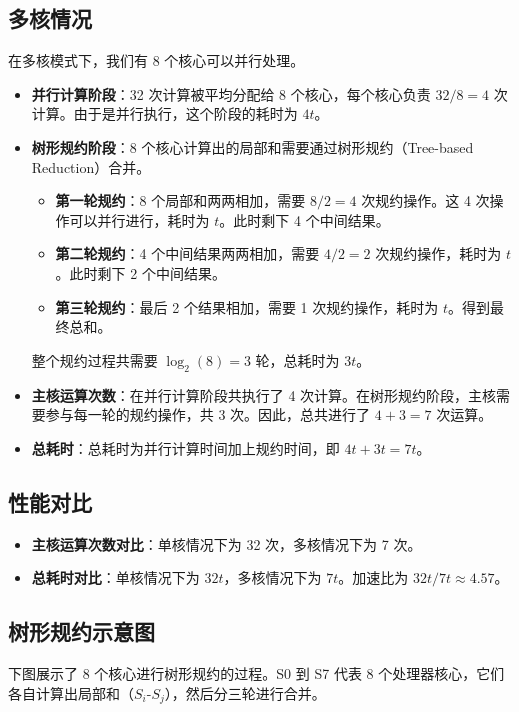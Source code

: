 \subsection{多核情况}
在多核模式下，我们有 8 个核心可以并行处理。
\begin{itemize}
    \item \textbf{并行计算阶段}：32 次计算被平均分配给 8 个核心，每个核心负责 $32 / 8 = 4$ 次计算。由于是并行执行，这个阶段的耗时为 $4t$。
    \item \textbf{树形规约阶段}：8 个核心计算出的局部和需要通过树形规约（Tree-based Reduction）合并。
    \begin{itemize}
        \item \textbf{第一轮规约}：8 个局部和两两相加，需要 $8/2=4$ 次规约操作。这 4 次操作可以并行进行，耗时为 $t$。此时剩下 4 个中间结果。
        \item \textbf{第二轮规约}：4 个中间结果两两相加，需要 $4/2=2$ 次规约操作，耗时为 $t$。此时剩下 2 个中间结果。
        \item \textbf{第三轮规约}：最后 2 个结果相加，需要 1 次规约操作，耗时为 $t$。得到最终总和。
    \end{itemize}
    整个规约过程共需要 $\log_2(8) = 3$ 轮，总耗时为 $3t$。
    \item \textbf{主核运算次数}：在并行计算阶段共执行了 4 次计算。在树形规约阶段，主核需要参与每一轮的规约操作，共 3 次。因此，总共进行了 $4 + 3 = 7$ 次运算。
    \item \textbf{总耗时}：总耗时为并行计算时间加上规约时间，即 $4t + 3t = 7t$。
\end{itemize}

\subsection{性能对比}
\begin{itemize}
    \item \textbf{主核运算次数对比}：单核情况下为 32 次，多核情况下为 7 次。
    \item \textbf{总耗时对比}：单核情况下为 $32t$，多核情况下为 $7t$。加速比为 $32t / 7t \approx 4.57$。
\end{itemize}

\subsection{树形规约示意图}
下图展示了 8 个核心进行树形规约的过程。S0 到 S7 代表 8 个处理器核心，它们各自计算出局部和（$S_i$-$S_j$），然后分三轮进行合并。

